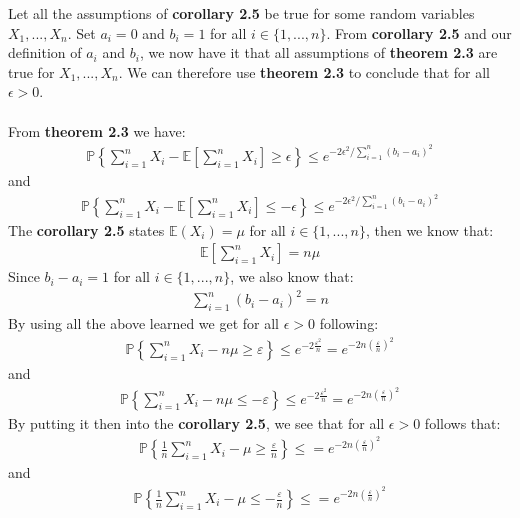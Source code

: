 Let all the assumptions of \textbf{corollary 2.5} be true for some random variables $X_1, ..., X_n$. Set $a_i = 0$ and $b_i=1$ for all $i \in \{1, ..., n\}$. 
From \textbf{corollary 2.5} and our definition of $a_i$ and $b_i$, we now have it that all assumptions of \textbf{theorem 2.3} are true for $X_1, ..., X_n$. 
We can therefore use \textbf{theorem 2.3} to conclude that for all $\epsilon >0$.\\\\
From \textbf{theorem 2.3} we have:
\begin{align}
\mathbb{P}\left\{ \sum_{i=1}^n X_i - \mathbb{E}\left[ \sum_{i=1}^n X_i \right] \geq \epsilon \right\} \leq e^{-2 \epsilon^2 / \sum_{i=1}^n (b_i - a_i)^2}
\end{align}
and
\begin{align}
\mathbb{P}\left\{ \sum_{i=1}^n X_i - \mathbb{E}\left[ \sum_{i=1}^n X_i \right] \leq - \epsilon \right\} \leq e^{-2 \epsilon^2 / \sum_{i=1}^n (b_i - a_i)^2}
\end{align}
The \textbf{corollary 2.5} states $\mathbb{E}(X_i) = \mu$ for all $i \in \{1, ..., n\}$, then we know that:
\begin{align}
\mathbb{E}\left[ \sum_{i=1}^n X_i \right] = n\mu 
\end{align}
Since $b_i - a_i = 1$ for all $i \in \{1, ..., n\}$, we also know that:
\begin{align}
\sum_{i=1}^n (b_i - a_i)^2 = n 
\end{align}
By using all the above learned we get for all $\epsilon > 0$ following:
\begin{align}
\mathbb{P}\left\{ \sum_{i=1}^n X_i - n\mu \geq \varepsilon \right\} \leq e^{- 2 \frac{\varepsilon^2}{n} } = e^{- 2n \left( \frac{ \varepsilon}{n} \right)^2 }
\end{align}
and
\begin{align}
\mathbb{P}\left\{ \sum_{i=1}^n X_i - n\mu \leq -\varepsilon \right\} \leq e^{- 2 \frac{\varepsilon^2}{n} } = e^{- 2n \left( \frac{ \varepsilon}{n} \right)^2 }
\end{align}
By putting it then into the \textbf{corollary 2.5}, we see that for all $\epsilon > 0$ follows that:
\begin{align}
\mathbb{P}\left\{\frac{1}{n} \sum_{i=1}^n X_i - \mu \geq \frac{\varepsilon}{n} \right\} \leq = e^{- 2n \left( \frac{ \varepsilon}{n} \right)^2 }
\end{align}
and
\begin{align}
\mathbb{P}\left\{\frac{1}{n} \sum_{i=1}^n X_i - \mu \leq- \frac{\varepsilon}{n} \right\} \leq = e^{- 2n \left( \frac{ \varepsilon}{n} \right)^2 }
\end{align}
